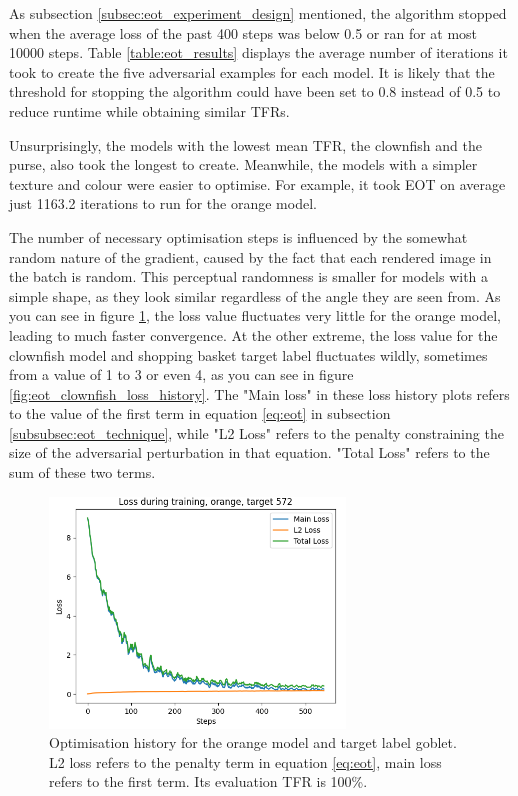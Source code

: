 As subsection \ref{subsec:eot_experiment_design} mentioned, the algorithm stopped when the average loss of the past 400 steps was below 0.5 or ran for at most 10000 steps. Table \ref{table:eot_results} displays the average number of iterations it took to create the five adversarial examples for each model. It is likely that the threshold for stopping the algorithm could have been set to 0.8 instead of 0.5 to reduce runtime while obtaining similar TFRs.

Unsurprisingly, the models with the lowest mean TFR, the clownfish and the purse, also took the longest to create. Meanwhile, the models with a simpler texture and colour were easier to optimise. For example, it took EOT on average just 1163.2 iterations to run for the orange model. 

The number of necessary optimisation steps is influenced by the somewhat random nature of the gradient, caused by the fact that each rendered image in the batch is random. This perceptual randomness is smaller for models with a simple shape, as they look similar regardless of the angle they are seen from. As you can see in figure \ref{fig:eot_orange_loss_history}, the loss value fluctuates very little for the orange model, leading to much faster convergence. At the other extreme, the loss value for the clownfish model and shopping basket target label fluctuates wildly, sometimes from a value of 1 to 3 or even 4, as you can see in figure \ref{fig:eot_clownfish_loss_history}. The "Main loss" in these loss history plots refers to the value of the first term in equation \ref{eq:eot} in subsection \ref{subsubsec:eot_technique}, while "L2 Loss" refers to the penalty constraining the size of the adversarial perturbation in that equation. "Total Loss" refers to the sum of these two terms.

\begin{figure}[ht]
    \centering
    \includegraphics[width=0.7\textwidth]{graphics/eot_orange_loss_history.PNG}
    \caption[Optimisation history for the orange model and target label goblet.]{Optimisation history for the orange model and target label goblet. L2 loss refers to the penalty term in equation \ref{eq:eot}, main loss refers to the first term. Its evaluation TFR is 100\%.}
    \label{fig:eot_orange_loss_history}
\end{figure}

